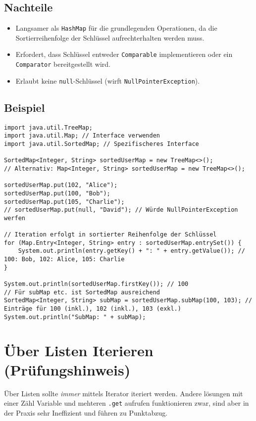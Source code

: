 \subsection{Nachteile}
\begin{itemize}
    \item Langsamer als \texttt{HashMap} für die grundlegenden Operationen, da die Sortierreihenfolge der Schlüssel aufrechterhalten werden muss.
    \item Erfordert, dass Schlüssel entweder \texttt{Comparable} implementieren oder ein \texttt{Comparator} bereitgestellt wird.
    \item Erlaubt keine \texttt{null}-Schlüssel (wirft \texttt{NullPointerException}).
\end{itemize}

\subsection{Beispiel}
\begin{lstlisting}[caption={Beispiel für die Verwendung einer TreeMap in Java}, label=lst:treeMapExample]
import java.util.TreeMap;
import java.util.Map; // Interface verwenden
import java.util.SortedMap; // Spezifischeres Interface

SortedMap<Integer, String> sortedUserMap = new TreeMap<>();
// Alternativ: Map<Integer, String> sortedUserMap = new TreeMap<>();

sortedUserMap.put(102, "Alice");
sortedUserMap.put(100, "Bob");
sortedUserMap.put(105, "Charlie");
// sortedUserMap.put(null, "David"); // Würde NullPointerException werfen

// Iteration erfolgt in sortierter Reihenfolge der Schlüssel
for (Map.Entry<Integer, String> entry : sortedUserMap.entrySet()) {
    System.out.println(entry.getKey() + ": " + entry.getValue()); // 100: Bob, 102: Alice, 105: Charlie
}

System.out.println(sortedUserMap.firstKey()); // 100
// Für subMap etc. ist SortedMap ausreichend
SortedMap<Integer, String> subMap = sortedUserMap.subMap(100, 103); // Einträge für 100 (inkl.), 102 (inkl.), 103 (exkl.)
System.out.println("SubMap: " + subMap);
\end{lstlisting}

\section{Über Listen Iterieren (Prüfungshinweis)}
Über Listen sollte \textit{immer} mittels Iterator iteriert werden. Andere lösungen mit einer Zähl Variable und mehteren \lstinline{.get} aufrufen funktionieren zwar, sind aber in der Praxis sehr Ineffizient und führen zu Punktabzug.